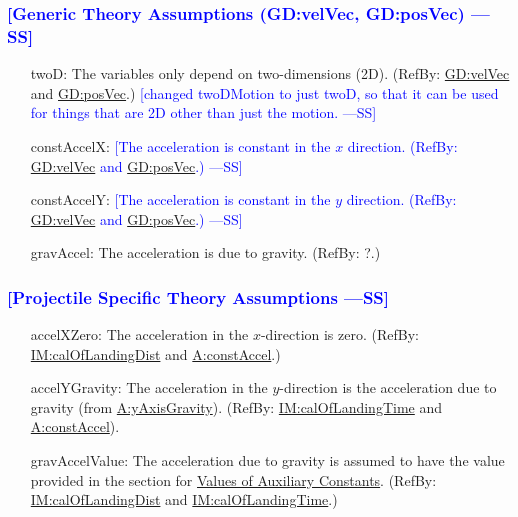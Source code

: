 \documentclass[12pt]{article}
\newcommand{\authornote}[3]{\textcolor{#1}{[#3 ---#2]}}
\newcommand{\authornote}[3]{}
\newcommand{\wss}[1]{\authornote{blue}{SS}{#1}}
\begin{document}
\subsubsection{\wss{Generic Theory Assumptions (GD:velVec, GD:posVec)}}

\begin{itemize}
\item[twoD:\phantomsection\label{twoD}]{The variables only depend on
two-dimensions (2D). (RefBy: \hyperref[GD:velVec]{GD:velVec} and
\hyperref[GD:posVec]{GD:posVec}.)} \wss{changed twoDMotion to just twoD, so that
it can be used for things that are 2D other than just the motion.}
\item[constAccelX:\phantomsection\label{constAccelX}]{\wss{The acceleration is constant in the $x$ direction. (RefBy: \hyperref[GD:velVec]{GD:velVec} and \hyperref[GD:posVec]{GD:posVec}.)}}
\item[constAccelY:\phantomsection\label{constAccelY}]{\wss{The acceleration is constant in the $y$ direction. (RefBy: \hyperref[GD:velVec]{GD:velVec} and \hyperref[GD:posVec]{GD:posVec}.)}}
\item[gravAccel:\phantomsection\label{gravAccel}]{The acceleration is due to gravity. (RefBy: ?.)}

\end{itemize}

\subsubsection{\wss{Projectile Specific Theory Assumptions}}

\begin{itemize}
\item[accelXZero:\phantomsection\label{accelXZero}]{The acceleration in the $x$-direction is zero. (RefBy: \hyperref[IM:calOfLandingDist]{IM:calOfLandingDist} and \hyperref[constAccel]{A:constAccel}.)}
\item[accelYGravity:\phantomsection\label{accelYGravity}]{The acceleration in the $y$-direction is the acceleration due to gravity (from \hyperref[yAxisGravity]{A:yAxisGravity}). (RefBy: \hyperref[IM:calOfLandingTime]{IM:calOfLandingTime} and \hyperref[constAccel]{A:constAccel}).}
\item[gravAccelValue:\phantomsection\label{gravAccelValue}]{The acceleration due to gravity is assumed to have the value provided in the section for \hyperref[Sec:AuxConstants]{Values of Auxiliary Constants}. (RefBy: \hyperref[IM:calOfLandingDist]{IM:calOfLandingDist} and \hyperref[IM:calOfLandingTime]{IM:calOfLandingTime}.)}
\end{itemize}
\end{document}
